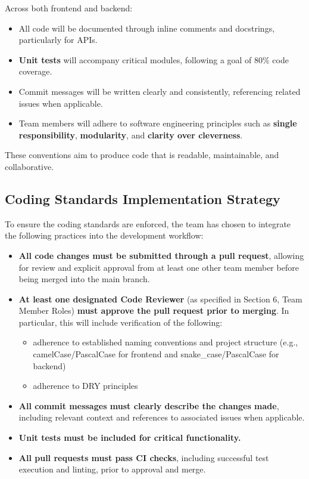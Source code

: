 \documentclass{article}
\begin{document}
Across both frontend and backend:
\begin{itemize}
  \item All code will be documented through inline comments and docstrings,
  particularly for APIs.
  \item \textbf{Unit tests} will accompany critical modules, following a goal of
  80\% code coverage.
  \item Commit messages will be written clearly and consistently, referencing
  related issues when applicable.
  \item Team members will adhere to software engineering principles such as
  \textbf{single responsibility}, \textbf{modularity}, and \textbf{clarity over
  cleverness}.
\end{itemize}

These conventions aim to produce code that is readable, maintainable, and
collaborative.

\subsection{Coding Standards Implementation Strategy}

To ensure the coding standards are enforced, the team has chosen to integrate the following practices into the development workflow:

\begin{itemize}
  \item \textbf{All code changes must be submitted through a pull request}, allowing for review and explicit approval from at least one other team member before being merged into the main branch.
  \item \textbf{At least one designated Code Reviewer} (as specified in Section 6, Team Member Roles) \textbf{must approve the pull request prior to merging}. In particular, this will include verification of the following:
  \begin{itemize}
      \item adherence to established naming conventions and project structure (e.g., camelCase/PascalCase for frontend and snake\_case/PascalCase for backend)
      \item adherence to DRY principles
  \end{itemize}
  \item \textbf{All commit messages must clearly describe the changes made}, including relevant context and references to associated issues when applicable.
  \item \textbf{Unit tests must be included for critical functionality.}
  \item \textbf{All pull requests must pass CI checks}, including successful test execution and linting, prior to approval and merge.
\end{itemize}
\end{document}
